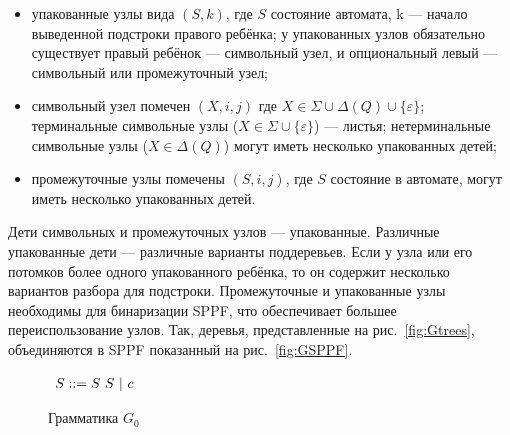 \begin{itemize}
	\item упакованные узлы вида $(S, k)$, где $S$ состояние автомата, k --- начало выведенной
	подстроки правого ребёнка; у упакованных узлов обязательно существует правый ребёнок ---
	символьный узел, и опциональный левый --- символьный или промежуточный узел;
	\item символьный узел помечен $(X, i, j)$ где $X \in \Sigma \cup \Delta(Q) \cup \{\varepsilon\}$;
	терминальные символьные узлы ($X \in \Sigma \cup \{\varepsilon\}$) --- листья;
	нетерминальные символьные узлы ($X \in \Delta(Q)$) могут иметь несколько упакованных детей;
	\item промежуточные узлы помечены $ (S, i, j) $, где $S$ состояние в автомате, могут иметь несколько упакованных детей.
\end{itemize}
Дети символьных и промежуточных узлов --- упакованные. Различные упакованные дети --- различные варианты поддеревьев.
Если у узла или его потомков более одного упакованного ребёнка, то он содержит несколько вариантов 
разбора для подстроки. Промежуточные и упакованные узлы необходимы для бинаризации SPPF, что обеспечивает большее переиспользование узлов.
Так, деревья, представленные на рис.~\ref{fig:Gtrees}, объединяются в SPPF показанный на рис.~\ref{fig:GSPPF}.
\begin{figure}
	\centering
	$
	\begin{array}[b]{rl}
	S ::= S\ S\ | \ c \ \ \ 
	\end{array}
	$
	\caption{Грамматика $G_0$}
	\label{fig:fig0}
\end{figure}
